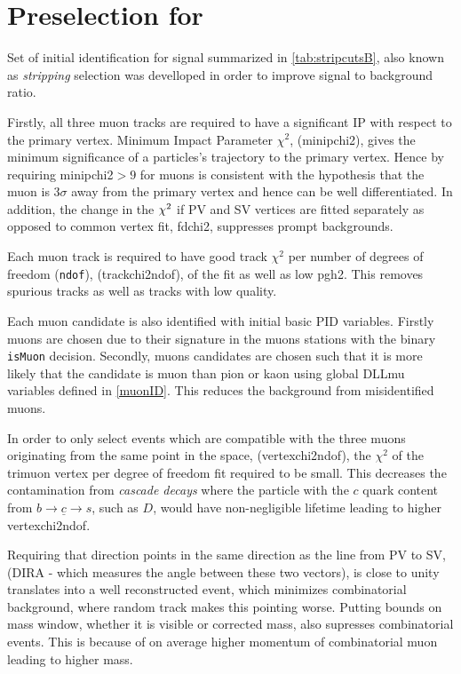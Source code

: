 \section{Preselection for \Bmumumu}

Set of initial identification for signal \Bmumumu summarized in \autoref{tab:stripcutsB}, also known as \textit{stripping} selection was develloped in order to improve signal to background ratio. 

Firstly, all three muon tracks are required to have a significant \gls{IP} with respect to the primary vertex. Minimum Impact Parameter $\chi^{2}$, (\gls{minipchi2}), gives the minimum significance of a particles's trajectory to the primary vertex. Hence by requiring \gls{minipchi2}$>9$ for muons is consistent with the hypothesis that the muon is $3\sigma$ away from the primary vertex and hence can be well differentiated. In addition, the change in the $\chi^2$ if \gls{PV} and \gls{SV} vertices are fitted separately as opposed to common vertex fit, \gls{fdchi2}, suppresses prompt backgrounds. 

Each muon track is required to have good track $\chi^{2}$ per number of degrees of freedom (\texttt{ndof}), (\gls{trackchi2ndof}), of the fit as well as low \gls{pgh2}. This removes spurious tracks as well as tracks with low quality.

Each muon candidate is also identified with initial basic \gls{PID} variables. Firstly muons are chosen due to their signature in the muons stations with the binary \texttt{isMuon} decision. Secondly, muons candidates are chosen such that it is more likely that the candidate is muon than pion or kaon using global DLLmu variables defined in \autoref{muonID}. This reduces the background from misidentified muons.

In order to only select events which are compatible with the three muons originating from the same point in the space, (\gls{vertexchi2ndof}), the $\chi^{2}$ of the trimuon vertex per degree of freedom fit required to be small. This decreases the contamination from \textit{cascade decays} where the particle with the $c$ quark content from $b \rightarrow \underline{c} \rightarrow s$, such as $D$, would have non-negligible lifetime leading to higher \gls{vertexchi2ndof}. 

Requiring that \Bp direction points in the same direction as the line from \gls{PV} to \gls{SV}, (\gls{DIRA} - which measures the angle between these two vectors), is close to unity translates into a well reconstructed event, which minimizes combinatorial background, where random track makes this pointing worse. Putting bounds on mass window, whether it is visible or corrected mass, also supresses combinatorial events. This is because of on average higher momentum of combinatorial muon leading to higher mass.  


